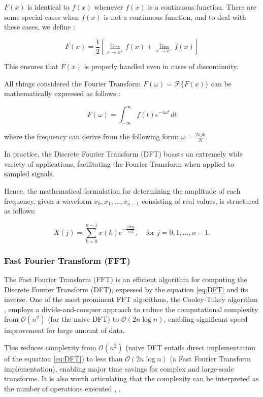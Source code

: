 {{\( F(x) \) is identical to \( f(x) \) whenever \( f(x) \) is a continuous function. 
There are some special cases when \( f(x) \) is not a continuous function, and to deal with these cases, we define  \cite{diff_eq}:

\begin{equation}
    F(x) = \frac{1}{2} \left[ \lim_{x \to x^+} f(x) + \lim_{x \to x^-} f(x) \right]
\end{equation}

This ensures that \( F(x) \) is properly handled even in cases of discontinuity.

All things considered the Fourier Transform \( F(\omega) = \mathcal{F} \{ F(x) \} \) can be mathematically expressed as follows  \cite{diff_eq}:


\begin{equation}
    F(\omega) = \int_{-\infty}^{\infty} f(t) e^{-i \omega t} \,dt
\end{equation}


where the frequency can derive from the following form: \( \omega = \frac{2\pi j k}{N} \).

In practice, the Discrete Fourier Transform (DFT) boasts an extremely wide variety of applications, facilitating the Fourier Transform when applied to sampled signals. 

Hence, the mathematical formulation for determining the amplitude of each frequency, given a waveform \( x_0, x_1, \dots, x_{n-1} \) consisting of real values, is structured as follows:

\begin{equation}
    X(j) = \sum_{k=0}^{n-1} x(k) e^{ - \frac{i 2\pi jk}{n/2} }, \quad \text{for } j = 0,1,\dots,n-1.
    \label{eq:DFT}
\end{equation}
}
\subsubsection{Fast Fourier Transform (FFT)}
{
The Fast Fourier Transform (FFT) is an efficient algorithm for computing the Discrete Fourier Transform (DFT), expessed by the equation \eqref{eq:DFT} and its inverse. One of the most prominent FFT algorithms, the Cooley-Tukey algorithm \cite{CooleyTukey1965}, employs a divide-and-conquer approach to reduce the computational complexity from $\mathcal{O}(n^2)$ (for the naive DFT) to $\mathcal{O}(2 n \log n)$, enabling significant speed improvement for large amount of data.

This reduces complexity from $\mathcal{O}(n^2)$ (naive DFT entails direct implementation of the equation \eqref{eq:DFT}) to less than $\mathcal{O}(2 n \log n)$ (a Fast Fourier Transform implementation), enabling major time savings for complex and large-scale transforms. It is also worth articulating that the complexity can be interpreted as the number of operations executed \cite{CooleyTukey1965}, \cite{Singeleton1967}. 

}}
